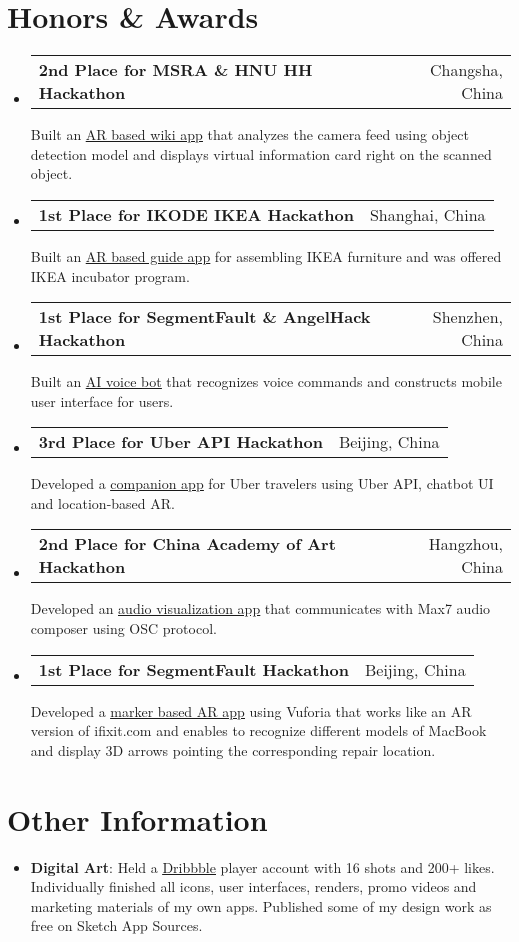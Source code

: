 \documentclass[letterpaper,11pt]{article}
\makeatletter
\newcommand{\resumeSubheadingExtended}[3]{
  \vspace{-0pt}\item
    \begin{tabular*}{0.97\textwidth}[t]{l@{\extracolsep{\fill}}r}
      \textbf{#1} & #2
    \end{tabular*}\vspace{-0pt}
    #3
    \vspace{-6pt}
}
\newcommand{\resumeSubHeadingListStart}{\begin{itemize}[leftmargin=*]}
\newcommand{\resumeSubHeadingListEnd}{\end{itemize}}
\makeatother
\begin{document}
\section{Honors \& Awards}
\resumeSubHeadingListStart
  	\resumeSubheadingExtended{2nd Place for MSRA \& HNU HH Hackathon}{Changsha, China}{Built an \underline{\href{https://github.com/JustinFincher/AReco}{AR based wiki app}} that analyzes the camera feed using object detection model and displays virtual information card right on the scanned object.}
	\resumeSubheadingExtended{1st Place for IKODE IKEA Hackathon}{Shanghai, China}
	{Built an \underline{\href{https://github.com/hACKbUSTER/IKEA-Maker}{AR based guide app}} for assembling IKEA furniture and was offered IKEA incubator program.}
	\resumeSubheadingExtended{1st Place for SegmentFault \& AngelHack Hackathon}{Shenzhen, China}
	{Built an \underline{\href{https://github.com/hACKbUSTER/ProjectDaVinci}{AI voice bot}} that recognizes voice commands and constructs mobile user interface for users.}
	\resumeSubheadingExtended{3rd Place for Uber API Hackathon}{Beijing, China}
	{Developed a \underline{\href{https://github.com/hACKbUSTER/UberGuide-iOS}{companion app}} for Uber travelers using Uber API, chatbot UI and location-based AR.}
	\resumeSubheadingExtended{2nd Place for China Academy of Art Hackathon}{Hangzhou, China}
	{Developed an \underline{\href{https://github.com/hACKbUSTER/Renaissance}{audio visualization app}} that communicates with Max7 audio composer using OSC protocol.}
	\resumeSubheadingExtended{1st Place for SegmentFault Hackathon}{Beijing, China}
	{Developed a \underline{\href{https://github.com/hACKbUSTER/FixPlusPlus}{marker based AR app}} using Vuforia that works like an AR version of ifixit.com and enables to recognize different models of MacBook and display 3D arrows pointing the corresponding repair location.}
\resumeSubHeadingListEnd

\section{Other Information}
  \resumeSubHeadingListStart
    \item{
      \textbf{Digital Art}{: Held a \underline{\href{https://dribbble.com/JustZht}{Dribbble}} player account with 16 shots and 200+ likes. Individually finished all icons, user interfaces, renders, promo videos and marketing materials of my own apps. Published some of my  design work as free on Sketch App Sources.}
    }
  \resumeSubHeadingListEnd

\end{document}

